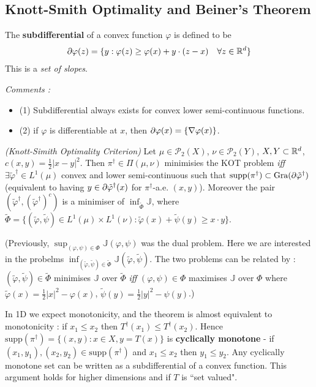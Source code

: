 \documentclass[12pt,a4paper]{article}
\renewenvironment{i}
{\begin{itemize} 
	}%
	{\end{itemize}
}
\begin{document}
\subsection{Knott-Smith Optimality and Beiner's Theorem}

 The \textbf{subdifferential} of a convex function $\varphi$ is defined to be
\begin{align*}
\partial \varphi(z) = \{y : \varphi(z) \geq \varphi(x) + y\cdot (z-x) \quad \forall z\in \mathbb{R}^d \}
\end{align*}
This is a \emph{set of slopes}.
\s

\emph{Comments :}
\begin{i}
\item[(1)] Subdifferential always exists for convex lower semi-continuous functions.
\item[(2)] if $\varphi$ is differentiable at $x$, then $\partial \varphi(x) = \{ \nabla \varphi(x) \}$.
\end{i}
\s

 \emph{(Knott-Simith Optimality Criterion)} Let $\mu \in \mathscr{P}_2(X)$, $\nu \in \mathscr{P}_2(Y)$, $X, Y \subset \mathbb{R}^d$, $c(x,y)= \frac{1}{2}|x-y|^2$. Then $\pi^{\dagger} \in \Pi(\mu, \nu)$ minimisies the KOT problem \emph{iff} $\exists \tilde{\varphi}^{\dagger} \in L^1(\mu)$ convex and lower semi-continuous such that $\text{supp}(\pi^{\dagger}) \subset \text{Gra}( \partial \tilde{\varphi}^{\dagger})$ (equivalent to having $y\in \partial \tilde{\varphi}^{\dagger}(x)$ for $\pi^{\dagger}$-a.e. $(x,y)$). Moreover the pair $(\tilde{\varphi}^{\dagger}, (\tilde{\varphi}^{\dagger})^c)$ is a minimiser of $\inf_{\tilde{\Phi}} \mathbb{J}$, where $\tilde{\Phi} = \{ (\tilde{\varphi}, \tilde{\psi}) \in L^1(\mu)\times L^1(\nu) : \tilde{\varphi}(x) + \tilde{\psi}(y) \geq x\cdot y \}$.
\s

(Previously, $\sup_{(\varphi, \psi) \in \Phi} \mathbb{J}(\varphi, \psi)$ was the dual problem. Here we are interested in the probelms $\inf_{(\tilde{\varphi}, \tilde{\psi}) \in \tilde{\Phi}} \mathbb{J}(\tilde{\varphi}, \tilde{\psi})$. The two problems can be related by : $(\tilde{\varphi}, \tilde{\psi}) \in \tilde{\Phi}$ minimises $\mathbb{J}$ over $\tilde{\Phi}$ \emph{iff} $(\varphi, \psi) \in \Phi$ maximises $\mathbb{J}$ over $\Phi$ where $\tilde{\varphi}(x) = \frac{1}{2} |x|^2 - \varphi(x)$, $\tilde{\psi}(y) = \frac{1}{2} |y|^2 - \psi(y)$.)
\s

In 1D we expect monotonicity, and the theorem is almost equivalent to monotonicity : if $x_1 \leq x_2$ then $T^{\dagger}(x_1) \leq T^{\dagger}(x_2)$. Hence $\text{supp}(\pi^{\dagger}) = \{(x,y) : x\in X, y= T(x)\}$ is \textbf{cyclically monotone} - if $(x_1, y_1), (x_2, y_2) \in \text{supp}(\pi^{\dagger})$ and $x_1\leq x_2$ then $y_1 \leq y_2$. Any cyclically monotone set can be written as a subdifferential of a convex function. This argument holds for higher dimensions and if $T$ is ``set valued".
\s
\end{document}
